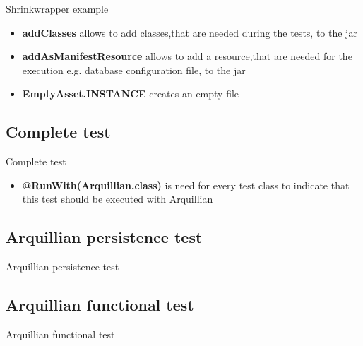 \begin{frame}{Shrinkwrapper example}
  

\begin{itemize}
	\item{\textbf{addClasses} allows to add classes,that are needed during the tests, to the jar}
	\item{\textbf{addAsManifestResource} allows to add a resource,that are needed for the execution e.g. database configuration file, to the jar}
	\item{\textbf{EmptyAsset.INSTANCE} creates an empty file}
\end{itemize}

\end{frame}

\subsection[Complete test]{Complete test}
\begin{frame}{Complete test}
  
\begin{itemize}
	\item{\textbf{@RunWith(Arquillian.class)} is need for every test class to indicate that this test should be executed with Arquillian}
	
\end{itemize}
\end{frame}
\subsection[Persistence test]{Arquillian persistence test}
\begin{frame}{Arquillian persistence test}
\end{frame}
\subsection[Functional test]{Arquillian functional test}
\begin{frame}{Arquillian functional test}
\end{frame}

